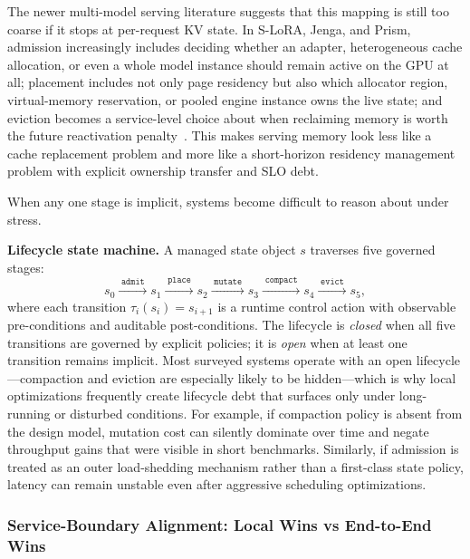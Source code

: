 \documentclass[acmsmall,screen,review]{acmart}
\begin{document}
The newer multi-model serving literature suggests that this mapping is still too coarse if it stops at per-request KV state. In S-LoRA, Jenga, and Prism, admission increasingly includes deciding whether an adapter, heterogeneous cache allocation, or even a whole model instance should remain active on the GPU at all; placement includes not only page residency but also which allocator region, virtual-memory reservation, or pooled engine instance owns the live state; and eviction becomes a service-level choice about when reclaiming memory is worth the future reactivation penalty~\cite{sheng2023slora,zhang2025jenga,yu2025prism}. This makes serving memory look less like a cache replacement problem and more like a short-horizon residency management problem with explicit ownership transfer and SLO debt.

When any one stage is implicit, systems become difficult to reason about under stress.

\smallskip\noindent\textbf{Lifecycle state machine.}
A managed state object \(s\) traverses five governed stages:
\[
s_0\xrightarrow{\;\texttt{admit}\;} s_1\xrightarrow{\;\texttt{place}\;} s_2\xrightarrow{\;\texttt{mutate}\;} s_3\xrightarrow{\;\texttt{compact}\;} s_4\xrightarrow{\;\texttt{evict}\;} s_5,
\]
where each transition \(\tau_i(s_i)=s_{i+1}\) is a runtime control action with observable pre-conditions and auditable post-conditions.
The lifecycle is \emph{closed} when all five transitions are governed by explicit policies; it is \emph{open} when at least one transition remains implicit.
Most surveyed systems operate with an open lifecycle---compaction and eviction are especially likely to be hidden---which is why local optimizations frequently create lifecycle debt that surfaces only under long-running or disturbed conditions.
For example, if compaction policy is absent from the design model, mutation cost can silently dominate over time and negate throughput gains that were visible in short benchmarks. Similarly, if admission is treated as an outer load-shedding mechanism rather than a first-class state policy, latency can remain unstable even after aggressive scheduling optimizations.

\subsubsection{Service-Boundary Alignment: Local Wins vs End-to-End Wins}
\end{document}
